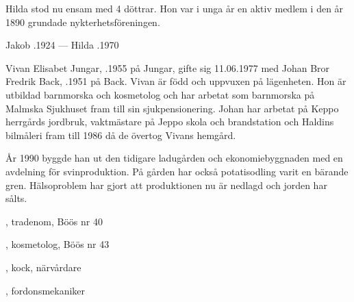 Hilda stod nu ensam med 4 döttrar. Hon var i unga år en aktiv medlem i den år 1890 grundade nykterhetsföreningen.
\begin{jhchildren}
  \item {}
  \item {}
  \item {}
  \item {}
  \item {}
\end{jhchildren}

Jakob .1924  ---  Hilda .1970






Vivan Elisabet Jungar, .1955 på Jungar, gifte sig 11.06.1977 med Johan Bror Fredrik Back, .1951 på Back. Vivan är född och uppvuxen på lägenheten. Hon är utbildad barnmorska och kosmetolog och har arbetat som barnmorska på Malmska Sjukhuset fram till sin sjukpensionering. Johan har arbetat på Keppo herrgårds jordbruk, vaktmästare på Jeppo skola och brandstation och Haldins bilmåleri fram till 1986 då de övertog Vivans hemgård.

År 1990 byggde han ut den tidigare ladugården och ekonomiebyggnaden med en avdelning för svinproduktion. På gården har också potatisodling varit en bärande gren. Hälsoproblem har gjort att produktionen nu är nedlagd och jorden har sålts.
\begin{jhchildren}
  \item {}, tradenom, Böös nr 40
  \item {}, kosmetolog, Böös nr 43
  \item {}, kock, närvårdare
  \item {}, fordonsmekaniker
\end{jhchildren}


